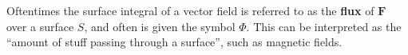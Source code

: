\begin{remark}
    Oftentimes the surface integral of a vector field is referred to as the \textbf{flux} of \(\mathbf{F}\) over a surface \(S\), and often is given the symbol \(\Phi \). This can be interpreted as the ``amount of stuff passing through a surface'', such as magnetic fields.
\end{remark}